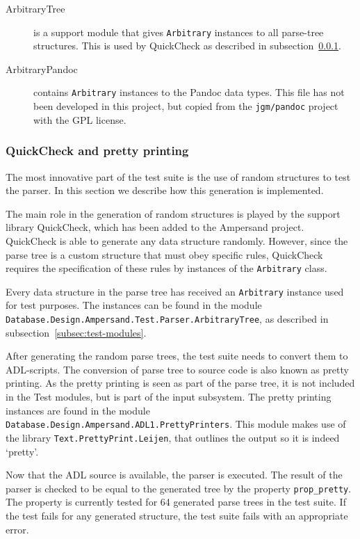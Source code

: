 \begin{description}
    \item[ArbitraryTree] is a support module that gives \texttt{Arbitrary} instances to all parse-tree structures.
      This is used by QuickCheck as described in subsection~\ref{subsec:quick-check}.
    
    \item[ArbitraryPandoc] contains \texttt{Arbitrary} instances to the Pandoc data types.
      This file has not been developed in this project, but copied from the \texttt{jgm/pandoc} project with the GPL license.
  \end{description}

  \subsubsection{QuickCheck and pretty printing}
  \label{subsec:quick-check}
  The most innovative part of the test suite is the use of random structures to test the parser.
  In this section we describe how this generation is implemented.
  
  The main role in the generation of random structures is played by the support library QuickCheck, which has been added to the Ampersand project.
  QuickCheck is able to generate any data structure randomly.
  However, since the parse tree is a custom structure that must obey specific rules, QuickCheck requires the specification of these rules by instances of the \texttt{Arbitrary} class.
  
  Every data structure in the parse tree has received an \texttt{Arbitrary} instance used for test purposes.
  The instances can be found in the module \texttt{Database.Design.Ampersand.Test.Parser\-.ArbitraryTree}, as described in subsection~\ref{subsec:test-modules}.
  
  After generating the random parse trees, the test suite needs to convert them to ADL-scripts.
  The conversion of parse tree to source code is also known as pretty printing.
  As the pretty printing is seen as part of the parse tree, it is not included in the Test modules, but is part of the input subsystem.
  The pretty printing instances are found in the module \texttt{Database.Design.Ampersand.ADL1.PrettyPrinters}.
  This module makes use of the library \texttt{Text.PrettyPrint.Leijen}, that outlines the output so it is indeed `pretty'.
  
  Now that the ADL source is available, the parser is executed.
  The result of the parser is checked to be equal to the generated tree by the property \texttt{prop\_pretty}.
  The property is currently tested for 64 generated parse trees in the test suite.
  If the test fails for any generated structure, the test suite fails with an appropriate error.
  
